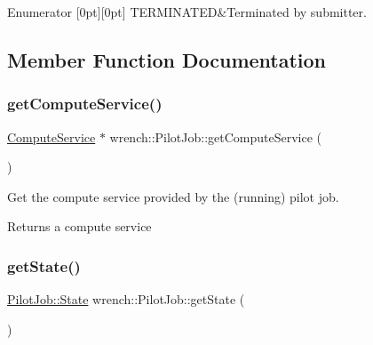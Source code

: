 \begin{DoxyEnumFields}{Enumerator}
[0pt][0pt]{}\mbox{\label{classwrench_1_1_pilot_job_a0540139dbc8b0a8506a87b2f55020fc8a21352143c29095d065e7a042b5dc453c}} 
T\+E\+R\+M\+I\+N\+A\+T\+ED&Terminated by submitter. \\
\hline

\end{DoxyEnumFields}


\subsection{Member Function Documentation}
\mbox{\label{classwrench_1_1_pilot_job_a296881f5e960313121e9cba4b89a1e9c}} 
\subsubsection{\texorpdfstring{get\+Compute\+Service()}{getComputeService()}}
{\footnotesize\ttfamily \hyperlink{classwrench_1_1_compute_service}{Compute\+Service} $\ast$ wrench\+::\+Pilot\+Job\+::get\+Compute\+Service (\begin{DoxyParamCaption}{ }\end{DoxyParamCaption})}



Get the compute service provided by the (running) pilot job. 

\begin{DoxyReturn}{Returns}
a compute service 
\end{DoxyReturn}
\mbox{\label{classwrench_1_1_pilot_job_a3890ff3cb3b494270c7a635748c91d95}} 
\subsubsection{\texorpdfstring{get\+State()}{getState()}}
{\footnotesize\ttfamily \hyperlink{classwrench_1_1_pilot_job_a0540139dbc8b0a8506a87b2f55020fc8}{Pilot\+Job\+::\+State} wrench\+::\+Pilot\+Job\+::get\+State (\begin{DoxyParamCaption}{ }\end{DoxyParamCaption})}



